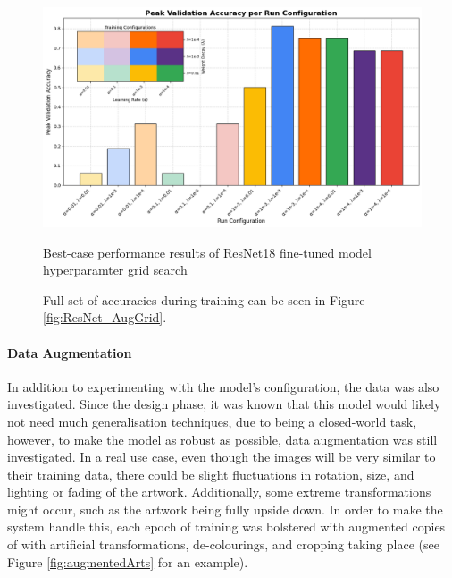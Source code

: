                         \begin{figure}[h]
                            \centering
                            \includegraphics[width=\textwidth]{images/ResNetCNN_AugGridHist.png}
                            \caption{Best-case performance results of ResNet18 fine-tuned model hyperparamter grid search}
                            \caption*{
                                Full set of accuracies during training can be seen in Figure \ref{fig:ResNet_AugGrid}.
                            }
                            \label{fig:ResNet_AugGridHist}
                        \end{figure}
        
                    \paragraph{Data Augmentation}
        
                        In addition to experimenting with the model's configuration, the data was also investigated. Since the design phase, it was known that this model would likely not need much generalisation techniques, due to being a closed-world task, however, to make the model as robust as possible, data augmentation was still investigated. In a real use case, even though the images will be very similar to their training data, there could be slight fluctuations in rotation, size, and lighting or fading of the artwork. Additionally, some extreme transformations might occur, such as the artwork being fully upside down. In order to make the system handle this, each epoch of training was bolstered with augmented copies of with artificial transformations, de-colourings, and cropping taking place (see Figure \ref{fig:augmentedArts} for an example).
    
